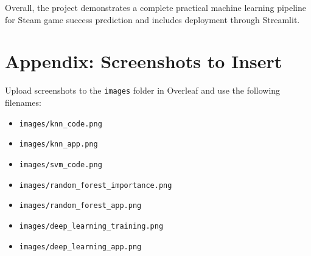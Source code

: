 \documentclass[12pt,a4paper]{article}
\begin{document}
Overall, the project demonstrates a complete practical machine learning pipeline for Steam game success prediction and includes deployment through Streamlit.

\newpage
\section{Appendix: Screenshots to Insert}

Upload screenshots to the \texttt{images} folder in Overleaf and use the following filenames:

\begin{itemize}
    \item \texttt{images/knn\_code.png}
    \item \texttt{images/knn\_app.png}
    \item \texttt{images/svm\_code.png}
    \item \texttt{images/random\_forest\_importance.png}
    \item \texttt{images/random\_forest\_app.png}
    \item \texttt{images/deep\_learning\_training.png}
    \item \texttt{images/deep\_learning\_app.png}
\end{itemize}
\end{document}
